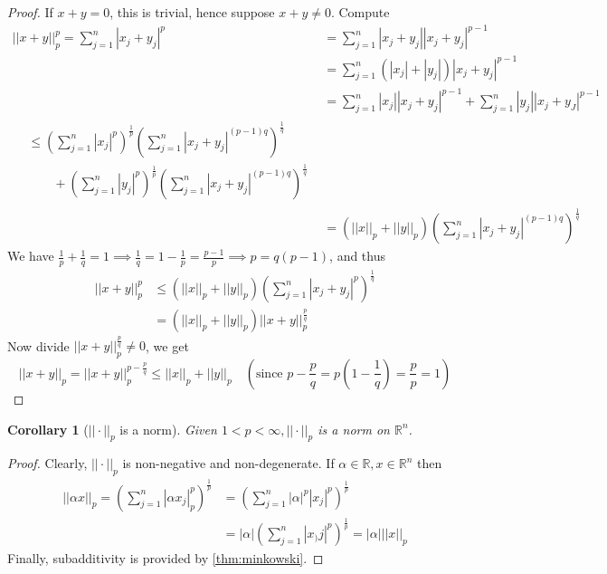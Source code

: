 \documentclass[11pt, oneside]{book}
\theoremstyle{break}
\newtheorem*{proof}{Proof}
\newtheorem{crly}{Corollary}[section]
\newcommand{\bb}[1]{\mathbb{#1}}			%
\begin{document}
\begin{proof}
	If $x  + y = 0$, this is trivial, hence suppose $x + y \neq 0$. Compute
	\begin{align*}
		||x + y||_p^p = \sum_{j=1}^{n} |x_j + y_j|^p &= \sum_{j=1}^{n} |x_j + y_j||x_j + y_j|^{p - 1} \\
					&= \sum_{j=1}^{n} \left( |x_j| + |y_j| \right) |x_j + y_j|^{p - 1} \\
					&= \sum_{j=1}^{n} |x_j||x_j + y_j|^{p-1} + \sum_{j=1}^{n} |y_j||x_j + y_J|^{p-1} \\
					\begin{split}
						&\leq \left( \sum_{j=1}^{n} |x_j|^p \right)^{\frac{1}{p}} \left( \sum_{j=1}^{n} |x_j + y_j|^{(p-1)q} \right)^{\frac{1}{q} } \\
						 &\qquad + \left( \sum_{j=1}^{n} |y_j|^p \right)^{\frac{1}{p}} \left( \sum_{j=1}^{n} |x_j + y_j|^{(p-1)q} \right)^{\frac{1}{q}}
					\end{split} \\
					&= (||x||_p + ||y||_p) \left( \sum_{j=1}^{n} |x_j + y_j|^{(p-1)q} \right)^{\frac{1}{q}}
	\end{align*}
	We have $\frac{1}{p} + \frac{1}{q} = 1 \implies \frac{1}{q} = 1 - \frac{1}{p} = \frac{p-1}{p} \implies p = q(p - 1)$, and thus
	\begin{align*}
		||x + y||_p^p &\leq (||x||_p + ||y||_p) \left(\sum_{j=1}^{n} |x_j + y_j|^p \right)^{\frac{1}{q} } \\
					&= (||x||_p + ||y||_p) ||x + y||_p^\frac{p}{q} 
	\end{align*}
	Now divide $||x + y||_p^\frac{p}{q}  \neq 0$, we get
	\begin{equation}
		||x + y||_p = ||x + y||_p^{p - \frac{p}{q}} \leq ||x||_p + ||y||_p \quad (\text{since } p - \frac{p}{q} = p(1 - \frac{1}{q}) = \frac{p}{p} = 1)
	\end{equation}
\end{proof}

\begin{crly}[$||\cdot||_p$ is a norm]
	Given $1 < p < \infty, ||\cdot||_p$ is a norm on $\bb{R}^n$.
\end{crly}

\begin{proof}
	Clearly, $||\cdot||_p$ is non-negative and non-degenerate. If $\alpha \in \bb{R}, x \in \bb{R}^n$ then
	\begin{align*}
		||\alpha x||_p = \left( \sum_{j=1}^{n} |\alpha x_j|_p^p \right)^{\frac{1}{p}} &= \left( \sum_{j=1}^{n} |\alpha|^p|x_j|^p \right)^{\frac{1}{p}} \\
						&= |\alpha| \left( \sum_{j=1}^{n} |x_)j|^p \right)^{\frac{1}{p}} = |\alpha|||x||_p
	\end{align*}
	Finally, subadditivity is provided by \autoref{thm:minkowski}.
\end{proof}
\end{document}
